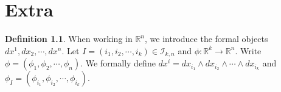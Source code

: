 \documentclass{book}
\theoremstyle{definition}
\newtheorem{defn}[definition]{Definition}
\newcommand{\R}{\mathbb{R}}
\newcommand{\MI}{\mathcal{I}}
\DeclareMathOperator*{\0}{\mbf{0}}
\DeclareMathOperator*{\1}{\mbf{1}}
\begin{document}
	
	
	
	
	
	
	
	
	
	
	
	
	
	
	
	
	
	
	
	
	
	
	
	
	
	
	
	
	
	




	
	
	
	
	
	
	
	
	
	
	
	
	
	
	
	
	
	
	
	
	\newpage 
	\chapter{Extra}
	\begin{defn}
		When working in $\R^n$, we introduce the formal objects $dx^1, dx_2, \cdots, dx^n$. Let $I = (i_1, i_2, \cdots, i_k)\in \MI_{k,n}$ and $\phi: \R^k \rightarrow \R^n$. Write $\phi = (\phi_1, \phi_2, \cdots, \phi_n)$. We formally define $dx^i = dx_{i_1}\wedge dx_{i_2} \wedge \cdots \wedge dx_{i_k}$ and $\phi_I = (\phi_{i_1}, \phi_{i_2}, \cdots, \phi_{i_k})$.   
	\end{defn}
	
\end{document}
